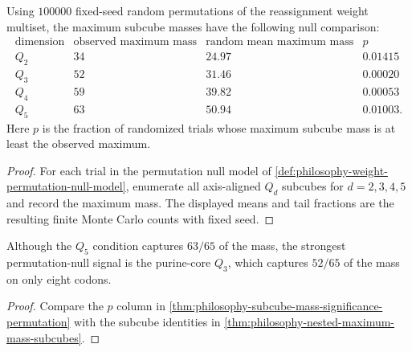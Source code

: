 \begin{theorem}
\label{thm:philosophy-subcube-mass-significance-permutation}
Using $100000$ fixed-seed random permutations of the reassignment weight
multiset, the maximum subcube masses have the following null comparison:
$$
\begin{array}{c|r|r|r}
  \text{dimension} & \text{observed maximum mass}
    & \text{random mean maximum mass} & p\\
\hline
  Q_{2} & 34 & 24.97 & 0.01415\\
  Q_{3} & 52 & 31.46 & 0.00020\\
  Q_{4} & 59 & 39.82 & 0.00053\\
  Q_{5} & 63 & 50.94 & 0.01003.
\end{array}
$$
Here $p$ is the fraction of randomized trials whose maximum subcube mass
is at least the observed maximum.
\end{theorem}
\begin{proof}
For each trial in the permutation null model of
\autoref{def:philosophy-weight-permutation-null-model}, enumerate all
axis-aligned $Q_{d}$ subcubes for $d=2,3,4,5$ and record the maximum
mass. The displayed means and tail fractions are the resulting finite
Monte Carlo counts with fixed seed.
\end{proof}

\begin{corollary}
\label{cor:philosophy-strongest-subcube-signal-three-dimensional}
Although the $Q_{5}$ condition captures $63/65$ of the mass, the
strongest permutation-null signal is the purine-core $Q_{3}$, which
captures $52/65$ of the mass on only eight codons.
\end{corollary}
\begin{proof}
Compare the $p$ column in
\autoref{thm:philosophy-subcube-mass-significance-permutation} with the
subcube identities in
\autoref{thm:philosophy-nested-maximum-mass-subcubes}.
\end{proof}

